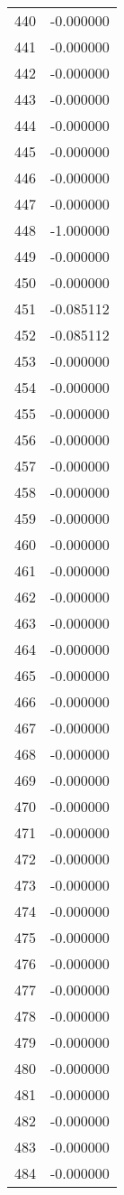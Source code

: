 \documentclass[12pt]{article}
\begin{document}
\begin{longtable}{@{}cc@{}}
440 & -0.000000 \\
441 & -0.000000 \\
442 & -0.000000 \\
443 & -0.000000 \\
444 & -0.000000 \\
445 & -0.000000 \\
446 & -0.000000 \\
447 & -0.000000 \\
448 & -1.000000 \\
449 & -0.000000 \\
450 & -0.000000 \\
451 & -0.085112 \\
452 & -0.085112 \\
453 & -0.000000 \\
454 & -0.000000 \\
455 & -0.000000 \\
456 & -0.000000 \\
457 & -0.000000 \\
458 & -0.000000 \\
459 & -0.000000 \\
460 & -0.000000 \\
461 & -0.000000 \\
462 & -0.000000 \\
463 & -0.000000 \\
464 & -0.000000 \\
465 & -0.000000 \\
466 & -0.000000 \\
467 & -0.000000 \\
468 & -0.000000 \\
469 & -0.000000 \\
470 & -0.000000 \\
471 & -0.000000 \\
472 & -0.000000 \\
473 & -0.000000 \\
474 & -0.000000 \\
475 & -0.000000 \\
476 & -0.000000 \\
477 & -0.000000 \\
478 & -0.000000 \\
479 & -0.000000 \\
480 & -0.000000 \\
481 & -0.000000 \\
482 & -0.000000 \\
483 & -0.000000 \\
484 & -0.000000 \\

\end{longtable}
\end{document}
